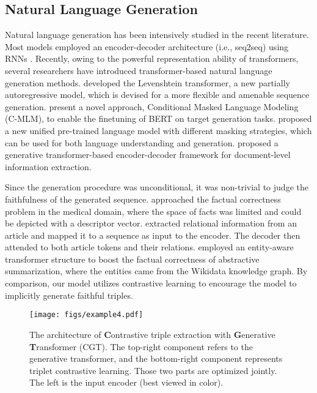 \documentclass[letterpaper]{article} \usepackage{aaai21}  \usepackage{times}  \usepackage{helvet} \usepackage{courier}  \usepackage[hyphens]{url}  \usepackage{graphicx} \urlstyle{rm} \def\UrlFont{\rm}  \usepackage{natbib}  \usepackage[noend]{algpseudocode}
\begin{document}
\subsection{Natural Language Generation} 
Natural language generation has been intensively studied in the recent literature. Most models employed an encoder-decoder architecture (i.e., seq2seq) using RNNs \cite{schuster1997bidirectional,zhang-etal-2020-summarizing,krause2020gedi}. Recently, owing to the powerful representation ability of transformers, several researchers have introduced transformer-based natural language generation methods. \citet{gu2019levenshtein} developed the Levenshtein transformer, a new partially autoregressive model, which is devised for a more flexible and amenable sequence generation. \citet{chen2020distilling} present a novel approach, Conditional Masked Language Modeling (C-MLM), to enable the finetuning of BERT \cite{devlin2018bert} on target generation tasks. \citet{dong2019unified} proposed a new unified pre-trained language model with different masking strategies, which can be used for both language understanding and generation. \citet{du2020document} proposed a generative transformer-based encoder-decoder framework for document-level information extraction.

Since the generation procedure was unconditional, it was non-trivial to judge the faithfulness of the generated sequence. \citet{zhang2019optimizing} approached the factual correctness problem in the medical domain, where the space of facts was limited and could be depicted with a descriptor vector. \citet{cao2017faithful} extracted relational information from an article and mapped it to a sequence as input to the encoder. The decoder then attended to both article tokens and their relations. \citet{gunel2020mind} employed an entity-aware transformer structure to boost the factual correctness of abstractive summarization, where the entities came from the Wikidata knowledge graph. By comparison, our model utilizes contrastive learning to encourage the model to implicitly generate faithful triples. 





\begin{figure*}[h]
\centering
  \texttt{[image: figs/example4.pdf]}
\caption{The architecture of \textbf{C}ontrastive triple extraction with \textbf{G}enerative \textbf{T}ransformer (CGT).  The top-right component refers to the generative transformer, and the bottom-right component represents triplet contrastive learning. Those two parts are optimized jointly. The left is the input encoder (best viewed in color).}
\label{arc}
\end{figure*}
\end{document}
